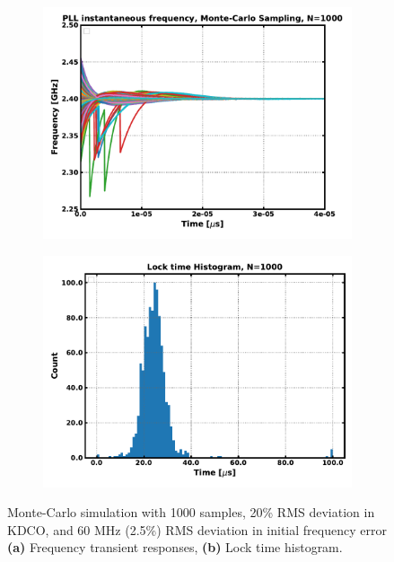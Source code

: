 	\begin{figure}[htb!]
	    \centering
	    \begin{subfigure}{0.5\textwidth}
	        \centering
	        \center\includegraphics[width=1.0\textwidth, angle=0]{figs/mc_trans.pdf}
	        \caption{ }
	        \label{fig:mc_trans}
	    \end{subfigure}%
	    \begin{subfigure}{0.5\textwidth}
	        \centering
	        \center\includegraphics[width=1.0\textwidth, angle=0]{figs/mc_hist.pdf}
	        \caption{ }
	        \label{fig:mc_hist}
	    \end{subfigure}
	    \label{fig:mc_sim}
	    \caption{Monte-Carlo simulation with 1000 samples, 20\% RMS deviation in KDCO, and 60 MHz (2.5\%) RMS deviation in initial frequency error \textbf{(a)} Frequency transient responses, \textbf{(b)} Lock time histogram.}
	\end{figure}

